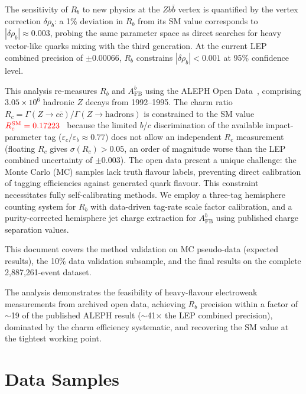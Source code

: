 \documentclass[11pt,a4paper]{article}
\newcommand{\external}[1]{\textcolor{red}{#1}}
\begin{document}
The sensitivity of $R_b$ to new physics at the $Zb\bar{b}$ vertex
is quantified by the vertex correction $\delta\rho_b$: a 1\%
deviation in $R_b$ from its SM value corresponds to
$|\delta\rho_b| \approx 0.003$, probing the same parameter space
as direct searches for heavy vector-like quarks mixing with the
third generation.
At the current LEP combined precision of $\pm 0.00066$, $R_b$
constrains $|\delta\rho_b| < 0.001$ at 95\% confidence level.

This analysis re-measures $R_b$ and $A_\text{FB}^b$ using the ALEPH
Open Data~\cite{ALEPH:opendata}, comprising $3.05 \times 10^6$ hadronic
$Z$ decays from 1992--1995.
The charm ratio $R_c = \Gamma(Z \to c\bar{c})/\Gamma(Z \to
\text{hadrons})$ is constrained to the SM value
$\external{R_c^\text{SM} = 0.17223}$~\cite{LEP:EWWG:2005}
because the limited $b$/$c$ discrimination of the available
impact-parameter tag ($\varepsilon_c/\varepsilon_b \approx 0.77$)
does not allow an independent $R_c$ measurement
(floating $R_c$ gives $\sigma(R_c) > 0.05$, an order of magnitude
worse than the LEP combined uncertainty of $\pm 0.003$).
The open data present a unique challenge: the Monte Carlo (MC) samples
lack truth flavour labels, preventing direct calibration of tagging
efficiencies against generated quark flavour.
This constraint necessitates fully self-calibrating methods.
We employ a three-tag hemisphere counting system for $R_b$ with
data-driven tag-rate scale factor calibration, and a purity-corrected
hemisphere jet charge extraction for $A_\text{FB}^b$ using published
charge separation values.

This document covers the method validation on MC pseudo-data
(expected results), the 10\% data validation subsample, and the
final results on the complete 2,887,261-event dataset.

The analysis demonstrates the feasibility of heavy-flavour
electroweak measurements from archived open data, achieving
$R_b$ precision within a factor of $\sim$19 of the published ALEPH
result ($\sim$41$\times$ the LEP combined precision),
dominated by the charm efficiency systematic, and
recovering the SM value at the tightest working point.

\section{Data Samples}
\label{sec:data}
\end{document}
